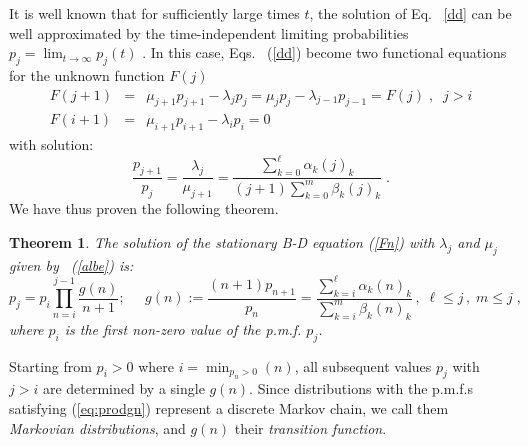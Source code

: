 \documentclass[a4paper,12pt]{amsart}
\newtheorem{Theorem}{Theorem}[section]
\theoremstyle{definition}
\theoremstyle{remark}
\begin{document}
It is well known that for sufficiently large times $t$, the solution of Eq.~ \ref{dd} can be well approximated by the time-independent limiting probabilities $p_j=\lim_{t\to\infty}p_j(t)$ \cite{Feller1, Anderson}.  In this case, Eqs.~ (\ref{dd}) become two functional equations for the unknown function $F(j)$
\begin{eqnarray}\label{Fn}
F(j+1) &=& \mu_{j+1} p_{j+1} - \lambda_j p_{j} = \mu_jp_{j}-\lambda_{j-1}p_{j-1} = F(j)\;,\;\;j > i\\ \nonumber  
F(i+1) &= & \mu_{i+1}p_{i+1} - \lambda_i p_{i} \!=0
\end{eqnarray}
 with solution: 
\begin{equation}
\frac{p_{j+1}}{p_j}  = \frac{\lambda_j}{\mu_{j+1}} = \frac{\sum_{k=0}^{\ell} \alpha_k (j)_k}{(j+1)\sum_{k=0}^{m} \beta_k (j)_{k}}\;.
\end{equation}
We have thus proven the following theorem.
\begin{Theorem} {\rm  \cite{Klebanov2023-xj}}
The solution of the stationary B-D equation  (\ref{Fn})  with  $\lambda_j $  and $\mu_j$  given by ~(\ref{albe}) is:
\begin{equation}\label{eq:prodgn}
p_j=p_i\prod_{n=i}^{j-1}\frac{g(n)}{n+1} ; \; \;\;\;\; 
g(n) := \frac{(n\!+\!1)p_{n+1}}{p_n} = \frac{\sum_{k=i}^{\ell} \alpha_k (n)_k}{\sum_{k=i}^{m} \beta_k (n)_{k}}\,, \; \ell \leq j\,, \; m \leq j\;,
\end{equation}
where $p_i$ is the first non-zero value of the p.m.f. $p_j$. 
\end{Theorem}
Starting from $p_i\!>\!0$ where $i\!=\!\min_{p_n>0}(n)$, all subsequent values $p_j$ with $j>i$ are determined by a single  $g(n)$. Since distributions with the p.m.f.{}s satisfying (\ref{eq:prodgn}) represent a discrete Markov chain, we call them {\it Markovian distributions}, and  $g(n)$ their {\it transition function}.
\end{document}
